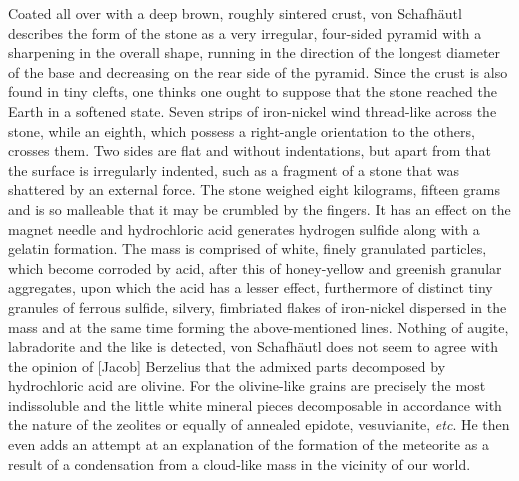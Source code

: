 \documentclass[a4paper, 12pt, oneside]{article}
\begin{document}
Coated all over with a deep brown, roughly sintered crust, von Schafhäutl describes the form of the stone as a very irregular, four-sided pyramid with a sharpening in the overall shape, running in the direction of the longest diameter of the base and decreasing on the rear side of the pyramid. Since the crust is also found in tiny clefts, one thinks one ought to suppose that the stone reached the Earth in a softened state. Seven strips of iron-nickel wind thread-like across the stone, while an eighth, which possess a right-angle orientation to the others, crosses them. Two sides are flat and without indentations, but apart from that the surface is irregularly indented, such as a fragment of a stone that was shattered by an external force. The stone weighed eight kilograms, fifteen grams and is so malleable that it may be crumbled by the fingers. It has an effect on the magnet needle and hydrochloric acid generates hydrogen sulfide along with a gelatin formation. The mass is comprised of white, finely granulated particles, which become corroded by acid, after this of honey-yellow and greenish granular aggregates, upon which the acid has a lesser effect, furthermore of distinct tiny granules of ferrous sulfide, silvery, fimbriated flakes of iron-nickel dispersed in the mass and at the same time forming the above-mentioned lines. Nothing of augite, labradorite and the like is detected, von Schafhäutl does not seem to agree with the opinion of [Jacob] Berzelius that the admixed parts decomposed by hydrochloric acid are olivine. For the olivine-like grains are precisely the most indissoluble and the little white mineral pieces decomposable in accordance with the nature of the zeolites or equally of annealed epidote, vesuvianite, \emph{etc}. He then even adds an attempt at an explanation of the formation of the meteorite as a result of a condensation from a cloud-like mass in the vicinity of our world.
\end{document}
